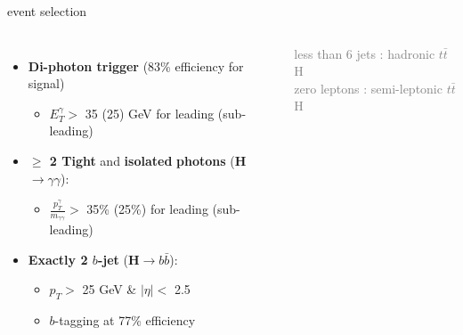 \begin{frame}{event selection}
\begin{columns}

\begin{itemize}
    \item \textbf{Di-photon trigger} (83\% efficiency for signal)
    \begin{itemize}
        \item $E_{T}^{\gamma} > $ 35 (25) GeV for leading (sub-leading)
    \end{itemize}
    \item \textbf{$\geq $ 2 Tight} and \textbf{isolated} \textbf{photons} (\textbf{\textcolor{HHturquoise_d}{H$\to\gamma\gamma$}}):
    \begin{itemize}
        \item $\frac{p_{T}^{\gamma}}{m_{\gamma\gamma}} > $ 35\% (25\%) for leading (sub-leading)
    \end{itemize}
    \item \textbf{Exactly 2 $b$-jet} (\textbf{\textcolor{HHred}{H$\to b\bar{b}$}}):
    \begin{itemize}
        \item $p_{T} > $ 25 GeV \& $|\eta| < $ 2.5
        \item $b$-tagging at 77\% efficiency
    \end{itemize}
\end{itemize}



\textcolor{gray}{less than 6 jets : hadronic $t\bar{t}$H} \\
\textcolor{gray}{zero leptons : semi-leptonic $t\bar{t}$H}



\end{columns}
\end{frame}
